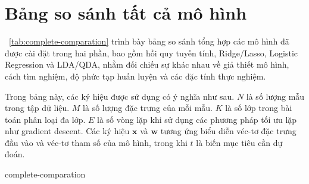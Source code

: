 \section{Bảng so sánh tất cả mô hình}

\tablename~\ref{tab:complete-comparation} trình bày bảng so sánh tổng hợp các
mô hình đã được cài đặt trong hai phần, bao gồm hồi quy tuyến tính,
Ridge/Lasso, Logistic Regression và LDA/QDA, nhằm đối chiếu sự khác nhau về giả
thiết mô hình, cách tìm nghiệm, độ phức tạp huấn luyện và các đặc tính thực
nghiệm.

Trong bảng này, các ký hiệu được sử dụng có ý nghĩa như sau. $N$ là số lượng
mẫu trong tập dữ liệu. $M$ là số lượng đặc trưng của mỗi mẫu. $K$ là số lớp
trong bài toán phân loại đa lớp. $E$ là số vòng lặp khi sử dụng các phương pháp
tối ưu lặp như gradient descent. Các ký hiệu $\boldsymbol{x}$ và
$\boldsymbol{w}$ tương ứng biểu diễn véc-tơ đặc trưng đầu vào và véc-tơ tham số
của mô hình, trong khi $t$ là biến mục tiêu cần dự đoán.

\begin{landscape}
{complete-comparation}
\end{landscape}
